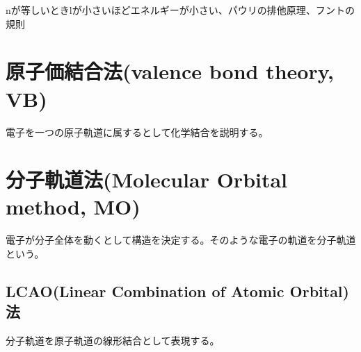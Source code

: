 nが等しいときlが小さいほどエネルギーが小さい、パウリの排他原理、フントの規則
\section{原子価結合法(valence bond theory, VB)}
	電子を一つの原子軌道に属するとして化学結合を説明する。
\section{分子軌道法(Molecular Orbital method, MO)}
	電子が分子全体を動くとして構造を決定する。そのような電子の軌道を分子軌道という。
	\subsection{LCAO(Linear Combination of Atomic Orbital)法}
		分子軌道を原子軌道の線形結合として表現する。
